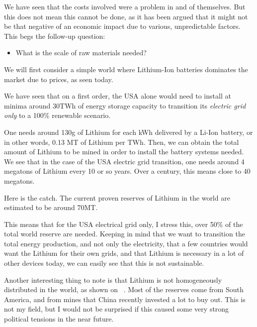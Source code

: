 \begin{kaobox}[frametitle=The Most Important Question]
We have seen that the costs involved were a problem in and of themselves. But this does not mean this cannot be done, as it has been argued that it might not be that negative of an economic impact due to various, unpredictable factors. This begs the follow-up question:

\begin{itemize}
\item What is the scale of raw materials needed?
\end{itemize}

\end{kaobox}

We will first consider a simple world where Lithium-Ion batteries dominates the market due to prices, as seen today.

We have seen that on a first order, the USA alone would need to install at minima around 30TWh of energy storage capacity to transition its \emph{electric grid only} to a 100\% renewable scenario.

One needs around 130g of Lithium for each kWh delivered by a Li-Ion battery, or in other words, 0.13 MT of Lithium per TWh. Then, we can obtain the total amount of Lithium to be mined in order to install the battery systems needed. We see that in the case of the USA electric grid transition, one needs around 4 megatons of Lithium every 10 or so years. Over a century, this means close to 40 megatons. 

Here is the catch. The current proven reserves of Lithium in the world are estimated to be around 70MT.

This means that for the USA electrical grid only, I stress this, over 50\% of the total world reserve are needed. Keeping in mind that we want to transition the total energy production, and not only the electricity, that a few countries would want the Lithium for their own grids, and that Lithium is necessary in a lot of other devices today, we can easily see that this is not sustainable.

Another interesting thing to note is that Lithium is not homogeneously distributed in the world, as shown on ~. Most of the reserves come from South America, and from mines that China recently invested a lot to buy out. This is not my field, but I would not be surprised if this caused some very strong political tensions in the near future.


